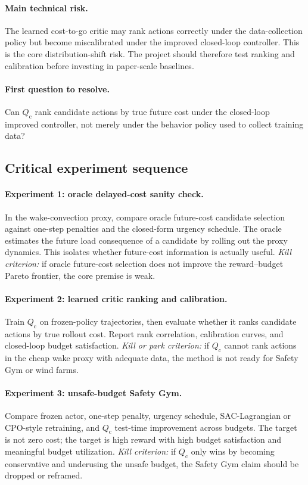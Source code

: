\documentclass[11pt]{article}
\newcommand{\Qc}{Q_{\mathrm c}}
\begin{document}
\paragraph{Main technical risk.}
The learned cost-to-go critic may rank actions correctly under the data-collection policy but become miscalibrated under the improved closed-loop controller.
This is the core distribution-shift risk.
The project should therefore test ranking and calibration before investing in paper-scale baselines.

\paragraph{First question to resolve.}
Can $\Qc$ rank candidate actions by true future cost under the closed-loop improved controller, not merely under the behavior policy used to collect training data?

\subsection{Critical experiment sequence}

\paragraph{Experiment 1: oracle delayed-cost sanity check.}
In the wake-convection proxy, compare oracle future-cost candidate selection against one-step penalties and the closed-form urgency schedule.
The oracle estimates the future load consequence of a candidate by rolling out the proxy dynamics.
This isolates whether future-cost information is actually useful.
\emph{Kill criterion:} if oracle future-cost selection does not improve the reward--budget Pareto frontier, the core premise is weak.

\paragraph{Experiment 2: learned critic ranking and calibration.}
Train $\Qc$ on frozen-policy trajectories, then evaluate whether it ranks candidate actions by true rollout cost.
Report rank correlation, calibration curves, and closed-loop budget satisfaction.
\emph{Kill or park criterion:} if $\Qc$ cannot rank actions in the cheap wake proxy with adequate data, the method is not ready for Safety Gym or wind farms.

\paragraph{Experiment 3: unsafe-budget Safety Gym.}
Compare frozen actor, one-step penalty, urgency schedule, SAC-Lagrangian or CPO-style retraining, and $\Qc$ test-time improvement across budgets.
The target is not zero cost; the target is high reward with high budget satisfaction and meaningful budget utilization.
\emph{Kill criterion:} if $\Qc$ only wins by becoming conservative and underusing the unsafe budget, the Safety Gym claim should be dropped or reframed.
\end{document}
